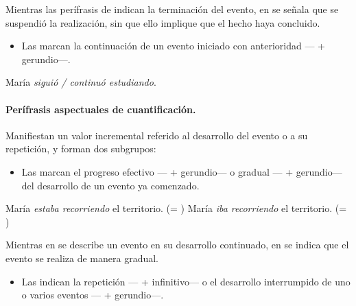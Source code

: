 Mientras las perífrasis de  indican la terminación del
evento, en  se señala que se suspendió la realización, sin
que ello implique que el hecho haya concluido.

\begin{itemize}
  \item Las  marcan la continuación de un
        evento iniciado con anterioridad --- +
        gerundio---.
\end{itemize}

\begin{exe}
  \ex María \textit{siguió / continuó estudiando}.
\end{exe}

\paragraph{Perífrasis aspectuales de cuantificación.} Manifiestan un valor
incremental referido al desarrollo del evento o a su repetición, y forman dos
subgrupos:

\begin{itemize}
  \item Las  marcan el progreso efectivo
        --- + gerundio--- o gradual --- +
        gerundio--- del desarrollo de un evento ya comenzado.
\end{itemize}

\begin{exe}
  \ex
    \begin{xlist}
      \ex\label{ex:11-prog-a} María \textit{estaba recorriendo} el territorio. (=
          )
      \ex\label{ex:11-prog-b} María \textit{iba recorriendo} el territorio. (=
          )
    \end{xlist}
\end{exe}

Mientras en  se describe un evento en su desarrollo
continuado, en  se indica que el evento se realiza de manera
gradual.

\begin{itemize}
  \item Las  indican la repetición
        --- + infinitivo--- o el desarrollo interrumpido de uno o
        varios eventos --- + gerundio---.
\end{itemize}

